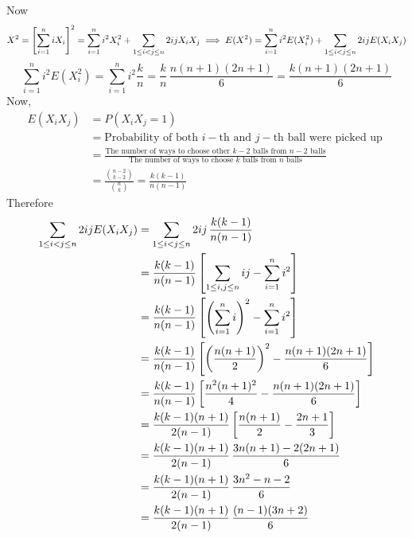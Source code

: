 \documentclass[a4paper, 11pt]{article}
\begin{document}
{		Now $$X^2=\left[\sum\limits_{i=1}^niX_i\right]^2=\sum_{i=1}^ni^2X_i^2+\sum_{1\leq i<j\leq n}2ijX_iX_j\implies E(X^2)=\sum_{i=1}^ni^2E(X_i^2)+\sum_{1\leq i<j\leq n}2ijE(X_iX_j)$$
		$$\sum_{i=1}^ni^2E(X_i^2)=\sum_{i=1}^ni^2\frac{k}{n}=\frac{k}{n}\, \frac{n(n+1)(2n+1)}{6}=\frac{k(n+1)(2n+1)}{6}$$Now, \begin{align*}
			E(X_iX_j) & =P(X_iX_j=1)                                                                                                                                                      \\
			          & =\text{Probability of both }i-\text{th and }j-\text{th ball were picked up }                                                                                      \\
			          & =\frac{\text{The number of ways to choose other }k-2\text{ balls from }n-2\text{ balls}}{\text{The number of ways to choose }k \text{ balls from }n\text{ balls}} \\
			          & =\frac{\binom{n-2}{k-2}}{\binom{n}{k}}=\frac{k(k-1)}{n(n-1)}
		\end{align*}
	Therefore \begin{align*}
		\sum_{1\leq i<j\leq n}2ijE(X_iX_j) & =\sum_{1\leq i<j\leq n}2ij\,\frac{k(k-1)}{n(n-1)}                                    \\
		                                   & =\frac{k(k-1)}{n(n-1)}\lt[\sum_{1\leq i,j\leq n}ij-\sum_{i=1}^ni^2\rt]               \\
		                                   & =\frac{k(k-1)}{n(n-1)}\lt[ \lt( \sum_{i=1}^ni\rt)^2-\sum_{i=1}^ni^2\rt]              \\
		                                   & =\frac{k(k-1)}{n(n-1)}\lt[ \lt( \frac{n(n+1)}{2} \rt)^2 -\frac{n(n+1)(2n+1)}{6} \rt] \\
		                                   & =\frac{k(k-1)}{n(n-1)}\lt[ \frac{n^2(n+1)^2}{4} -\frac{n(n+1)(2n+1)}{6} \rt]         \\
		                                   & =\frac{k(k-1)(n+1)}{2(n-1)} \lt[ \frac{n(n+1)}{2}-\frac{2n+1}{3} \rt]                \\
		                                   & =\frac{k(k-1)(n+1)}{2(n-1)}\, \frac{3n(n+1)-2(2n+1)}{6}                              \\
		                                   & =\frac{k(k-1)(n+1)}{2(n-1)}\, \frac{3n^2-n-2}{6}                                     \\
		                                   & =\frac{k(k-1)(n+1)}{2(n-1)}\, \frac{(n-1)(3n+2)}{6}                                  \\

\end{align*}}
\end{document}
